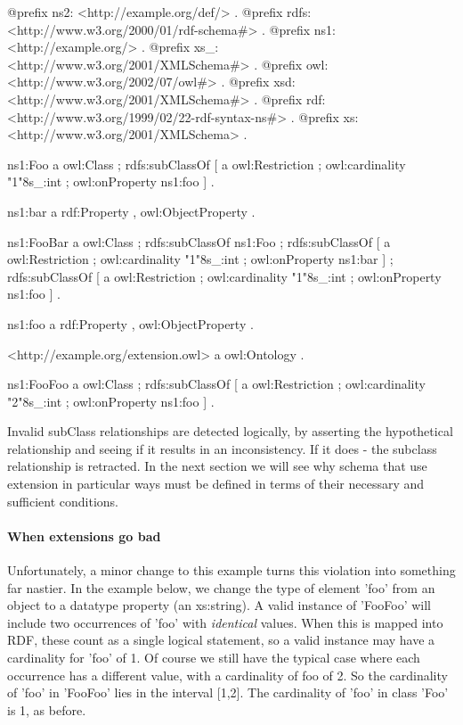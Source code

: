 \begin{DoxyCodeInclude}
@prefix ns2:     <http://example.org/def/> .
@prefix rdfs:    <http://www.w3.org/2000/01/rdf-schema#> .
@prefix ns1:     <http://example.org/> .
@prefix xs_:     <http://www.w3.org/2001/XMLSchema#> .
@prefix owl:     <http://www.w3.org/2002/07/owl#> .
@prefix xsd:     <http://www.w3.org/2001/XMLSchema#> .
@prefix rdf:     <http://www.w3.org/1999/02/22-rdf-syntax-ns#> .
@prefix xs:      <http://www.w3.org/2001/XMLSchema> .

ns1:Foo
      a       owl:Class ;
      rdfs:subClassOf
              [ a       owl:Restriction ;
                owl:cardinality "1"^^xs_:int ;
                owl:onProperty ns1:foo
              ] .

ns1:bar
      a       rdf:Property , owl:ObjectProperty .

ns1:FooBar
      a       owl:Class ;
      rdfs:subClassOf ns1:Foo ;
      rdfs:subClassOf
              [ a       owl:Restriction ;
                owl:cardinality "1"^^xs_:int ;
                owl:onProperty ns1:bar
              ] ;
      rdfs:subClassOf
              [ a       owl:Restriction ;
                owl:cardinality "1"^^xs_:int ;
                owl:onProperty ns1:foo
              ] .

ns1:foo
      a       rdf:Property , owl:ObjectProperty .

<http://example.org/extension.owl>
      a       owl:Ontology .

ns1:FooFoo
      a       owl:Class ;
      rdfs:subClassOf
              [ a       owl:Restriction ;
                owl:cardinality "2"^^xs_:int ;
                owl:onProperty ns1:foo
              ] .
\end{DoxyCodeInclude}


Invalid subClass relationships are detected logically, by asserting the hypothetical relationship and seeing if it results in an inconsistency. If it does -\/ the subclass relationship is retracted. In the next section we will see why schema that use extension in particular ways must be defined in terms of their necessary and sufficient conditions.\hypertarget{extensioncomplexcontent_badExtensions}{}\paragraph{When extensions go bad}\label{extensioncomplexcontent_badExtensions}
Unfortunately, a minor change to this example turns this violation into something far nastier. In the example below, we change the type of element 'foo' from an object to a datatype property (an xs:string). A valid instance of 'FooFoo' will include two occurrences of 'foo' with {\itshape identical\/} values. When this is mapped into RDF, these count as a single logical statement, so a valid instance may have a cardinality for 'foo' of 1. Of course we still have the typical case where each occurrence has a different value, with a cardinality of foo of 2. So the cardinality of 'foo' in 'FooFoo' lies in the interval \mbox{[}1,2\mbox{]}. The cardinality of 'foo' in class 'Foo' is 1, as before.

